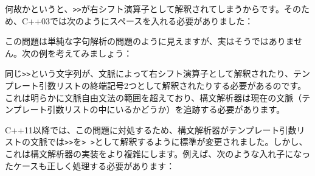 何故かというと、\texttt{\textgreater{}\textgreater{}}が右シフト演算子として解釈されてしまうからです。そのため、C++03では次のようにスペースを入れる必要がありました：

\begin{Shaded}
\begin{Highlighting}[]
\end{Highlighting}
\end{Shaded}

この問題は単純な字句解析の問題のように見えますが、実はそうではありません。次の例を考えてみましょう：

\begin{Shaded}
\begin{Highlighting}[]
\NormalTok{\textless{}}
      
\NormalTok{\};}

\NormalTok{;}

\end{Highlighting}
\end{Shaded}

同じ\texttt{\textgreater{}\textgreater{}}という文字列が、文脈によって右シフト演算子として解釈されたり、テンプレート引数リストの終端記号2つとして解釈されたりする必要があるのです。これは明らかに文脈自由文法の範囲を超えており、構文解析器は現在の文脈（テンプレート引数リストの中にいるかどうか）を追跡する必要があります。

C++11以降では、この問題に対処するため、構文解析器がテンプレート引数リストの文脈では\texttt{\textgreater{}\textgreater{}}を\texttt{\textgreater{}\ \textgreater{}}として解釈するように標準が変更されました。しかし、これは構文解析器の実装をより複雑にします。例えば、次のような入れ子になったケースも正しく処理する必要があります：

